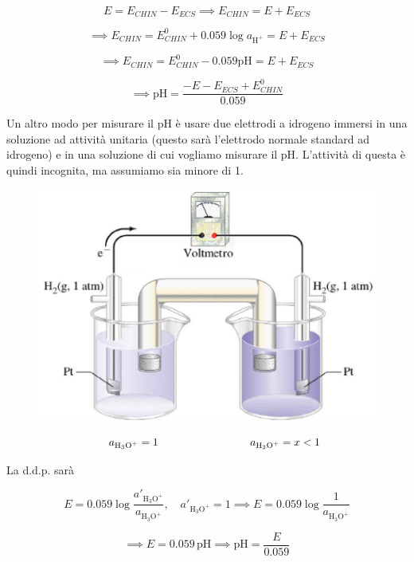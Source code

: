 $$E= E_{CHIN} - E_{ECS} \implies E_{CHIN}= E + E_{ECS}$$

$$\implies E_{CHIN} = E^{0}_{CHIN} + 0.059 \log a_{\text{H}^+} = E + E_{ECS}$$

$$\implies E_{CHIN} = E^{0}_{CHIN} - 0.059 \text{pH} = E + E_{ECS}$$

$$\implies \text{pH} = \frac{-E - E_{ECS} + E^0_{CHIN}}{0.059}$$

Un altro modo per misurare il pH è usare due elettrodi a idrogeno  immersi in una soluzione ad attività unitaria (questo sarà l'elettrodo normale standard ad idrogeno) e in una soluzione di cui vogliamo misurare il pH. L'attività di questa è quindi incognita, ma assumiamo sia minore di 1.

\begin{figure}[H]
    \centering
    \includegraphics[width=12cm]{immagini/elettrodo_pH.png}
\end{figure}

\vspace{-1cm}$$\hspace{0.5cm}a_{\text{H}_3\text{O}^+}= 1 \hspace{3cm} a_{\text{H}_3\text{O}^+}=x<1$$

La d.d.p. sarà

$$E = 0.059 \log \frac{a'_{\text{H}_3\text{O}^+}}{a_{\text{H}_3\text{O}^+}}, \quad a'_{\text{H}_3\text{O}^+}=1 \implies E = 0.059 \log \frac{1}{a_{\text{H}_3\text{O}^+}}$$

$$ \implies E= 0.059 \, \text{pH} \implies \text{pH} = \frac{E}{0.059}$$


